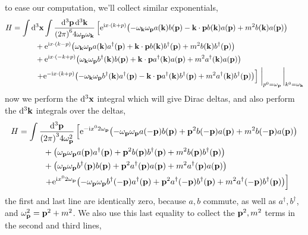 to ease our computation, we'll collect similar exponentials,
\begin{align}
    H&=\int\dd[3]{\vb x}\int\frac{\dd[3]{\vb p}\dd[3]{\vb k}}{\qty(2\pi)^64\omega_{\vb p}\omega_{\vb k}}\left[\e^{\im x\cdot\qty(k+p)}\qty(-\omega_{\vb k}\omega_{\vb p}a\qty(\vb k)b\qty(\vb p)-\vb k\cdot \vb p b\qty(\vb k)a\qty(\vb p)+m^2b\qty(\vb k)a\qty(\vb p))\right.\nonumber\\
    &\quad\quad\quad+\e^{\im x\cdot\qty(k-p)}\qty(\omega_{\vb k}\omega_{\vb p}a\qty(\vb k)a^\dagger\qty(\vb p)+\vb k\cdot \vb p b\qty(\vb k)b^\dagger\qty(\vb p)+m^2b\qty(\vb k)b^\dagger\qty(\vb p))\nonumber\\
    &\quad\quad\quad+\e^{\im x\cdot\qty(-k+p)}\qty(\omega_{\vb k}\omega_{\vb p}b^\dagger\qty(\vb k)b\qty(\vb p)+\vb k\cdot \vb p a^\dagger\qty(\vb k)a\qty(\vb p)+m^2a^\dagger\qty(\vb k)a\qty(\vb p))\nonumber\\
    &\quad\quad\quad\left.+\e^{-\im x\cdot\qty(k+p)}\qty(-\omega_{\vb k}\omega_{\vb p}b^\dagger\qty(\vb k)a^\dagger\qty(\vb p)-\vb k\cdot \vb p a^\dagger\qty(\vb k)b^\dagger\qty(\vb p)+m^2a^\dagger\qty(\vb k)b^\dagger\qty(\vb p))\right]\eval_{p^0=\omega_{\vb p}}\eval_{k^0=\omega_{\vb k}}
\end{align}
now we perform the $\dd[3]{\vb x}$ integral which will give Dirac deltas, and also perform the $\dd[3]{\vb k} $ integrals over the deltas,
\begin{align}
    H&=\int\frac{\dd[3]{\vb p}}{\qty(2\pi)^34\omega_{\vb p}^2}\left[\textnormal{e}^{-\textnormal{i} x^02\omega_{\vb p}}\qty(-\omega_{\vb p}\omega_{\vb p}a\qty(-\vb p)b\qty(\vb p)+\vb p^2 b\qty(-\vb p)a\qty(\vb p)+m^2b\qty(-\vb p)a\qty(\vb p))\right.\nonumber\\
    &\quad\quad\quad+\qty(\omega_{\vb p}\omega_{\vb p}a\qty(\vb p)a^\dagger\qty(\vb p)+ \vb p^2 b\qty(\vb p)b^\dagger\qty(\vb p)+m^2b\qty(\vb p)b^\dagger\qty(\vb p))\nonumber\\
    &\quad\quad\quad+\qty(\omega_{\vb p}\omega_{\vb p}b^\dagger\qty(\vb p)b\qty(\vb p)+\vb p^2 a^\dagger\qty(\vb p)a\qty(\vb p)+m^2a^\dagger\qty(\vb p)a\qty(\vb p))\nonumber\\
    &\quad\quad\quad\left.+\textnormal{e}^{\textnormal{i} x^02\omega_{\vb p}}\qty(-\omega_{\vb p}\omega_{\vb p}b^\dagger\qty(-\vb p)a^\dagger\qty(\vb p)+\vb p^2 a^\dagger\qty(-\vb p)b^\dagger\qty(\vb p)+m^2a^\dagger\qty(-\vb p)b^\dagger\qty(\vb p))\right]
\end{align}
the first and last line are identically zero, because $a,b$ commute, as well as $a^\dagger,b^\dagger$, and $\omega_{\vb p}^2=\vb p^2+m^2$. We also use this last equality to collect the $\vb p^2,m^2$ terms in the second and third lines,
